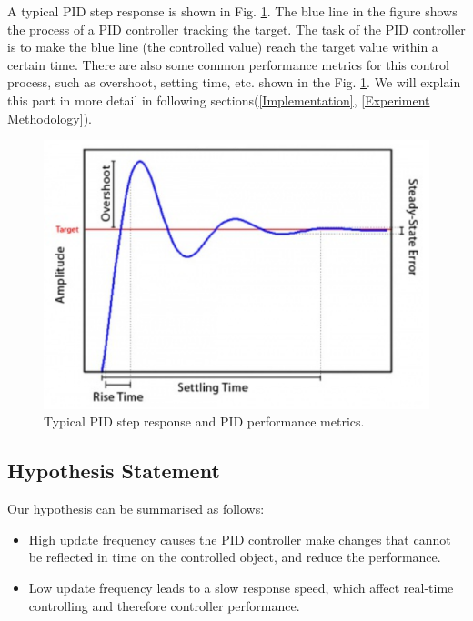 \documentclass[conference]{IEEEtran}
\begin{document}
A typical PID step response\cite{goodwin2001control} is shown in Fig. \ref{PIDandSettlingTime}. The blue line in the figure shows the process of a PID controller tracking the target. %
The task of the PID controller is to make the blue line (the controlled value) reach the target value within a certain time. There are also some common performance metrics for this control process, such as overshoot, setting time, etc. shown in the 
 Fig. \ref{PIDandSettlingTime}. We will explain this part in more detail in following sections(\ref{Implementation}, \ref{Experiment Methodology}).
\begin{figure}[htbp]
\centerline{\includegraphics[width=0.9\linewidth]{Report/Pic/PIDandSettlingTime.png}}
\caption{Typical PID step response and PID performance metrics.}
\label{PIDandSettlingTime}
\end{figure}

\subsection{Hypothesis Statement}
Our hypothesis can be summarised as follows:
\begin{itemize}
    \item High update frequency causes the PID controller make changes that cannot be reflected in time on the controlled object, and reduce the performance.
    \item Low update frequency leads to a slow response speed\cite{knospe2006pid}, which affect real-time controlling and therefore controller performance.
\end{itemize}
\end{document}
